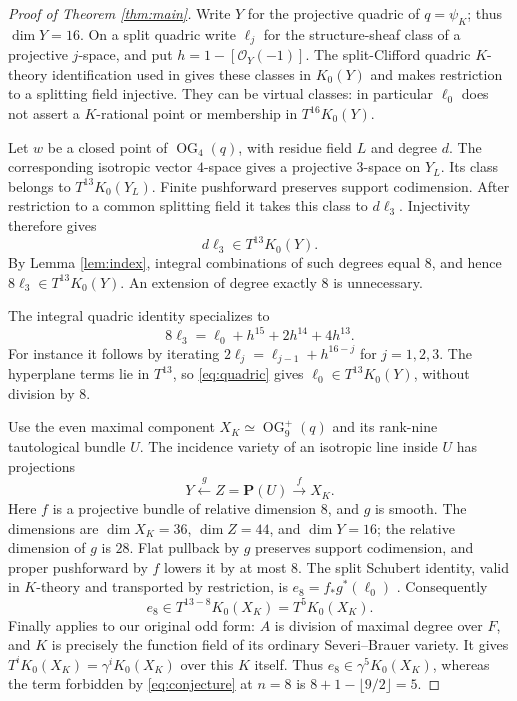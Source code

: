 \documentclass[11pt]{article}
\newcommand{\OG}{\operatorname{OG}}
\begin{document}
\begin{proof}[Proof of Theorem \ref{thm:main}]
Write $Y$ for the projective quadric of $q=\psi_K$; thus $\dim Y=16$.
On a split quadric write $\ell_j$ for the structure-sheaf class of a
projective $j$-space, and put $h=1-[\mathcal O_Y(-1)]$.
The split-Clifford quadric $K$-theory identification used in
\cite[\S4]{around} gives these classes in $K_0(Y)$ and makes restriction
to a splitting field injective. They can be virtual classes: in
particular $\ell_0$ does not assert a $K$-rational point or membership
in $T^{16}K_0(Y)$.

Let $w$ be a closed point of $\OG_4(q)$, with residue field $L$ and degree
$d$. The corresponding isotropic vector $4$-space gives a projective
$3$-space on $Y_L$. Its class belongs to $T^{13}K_0(Y_L)$.
Finite pushforward preserves support codimension. After restriction
to a common splitting field it takes this class to $d\ell_3$.
Injectivity therefore gives
\[
                         d\ell_3\in T^{13}K_0(Y).
\]
By Lemma \ref{lem:index}, integral combinations of such degrees equal
$8$, and hence $8\ell_3\in T^{13}K_0(Y)$. An extension of degree
exactly $8$ is unnecessary.

The integral quadric identity
\cite[proof following Conjecture 4.7]{around} specializes to
\begin{equation}\label{eq:quadric}
          8\ell_3=\ell_0+h^{15}+2h^{14}+4h^{13}.
\end{equation}
For instance it follows by iterating
$2\ell_j=\ell_{j-1}+h^{16-j}$ for $j=1,2,3$.
The hyperplane terms lie in $T^{13}$, so \eqref{eq:quadric} gives
$\ell_0\in T^{13}K_0(Y)$, without division by $8$.

Use the even maximal component $X_K\simeq\OG^+_9(q)$ and its rank-nine
tautological bundle $U$. The incidence variety of an isotropic line
inside $U$ has projections
\[
             Y\xleftarrow{\ g\ }Z=\mathbf P(U)
                     \xrightarrow{\ f\ }X_K.
\]
Here $f$ is a projective bundle of relative dimension $8$, and $g$ is
smooth. The dimensions are $\dim X_K=36$, $\dim Z=44$, and $\dim Y=16$;
the relative dimension of $g$ is $28$. Flat pullback by $g$ preserves
support codimension, and proper pushforward by $f$ lowers it by at most
$8$. The split Schubert identity, valid in $K$-theory and transported
by restriction, is $e_8=f_*g^*(\ell_0)$
\cite[\S4, the $K$-theoretic version of (1.2)]{around}. Consequently
\[
                       e_8\in T^{13-8}K_0(X_K)=T^5K_0(X_K).
\]
Finally \cite[Theorem 4.3]{around} applies to our original odd form:
$A$ is division of maximal degree over $F$, and $K$ is precisely the
function field of its ordinary Severi--Brauer variety. It gives
$T^iK_0(X_K)=\gamma^iK_0(X_K)$ over this $K$ itself. Thus
$e_8\in\gamma^5K_0(X_K)$, whereas the term forbidden by
\eqref{eq:conjecture} at $n=8$ is $8+1-\lfloor9/2\rfloor=5$.
\end{proof}
\end{document}

